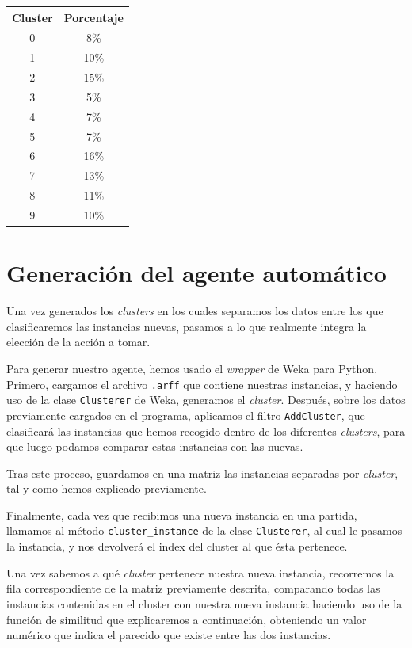 \documentclass[12pt]{article}
\begin{document}
\begin{center}
    \begin{tabular}{c | c}
        \hline
        Cluster & Porcentaje \\
        \hline
        0   &    8\% \\
        1   &   10\% \\
        2   &   15\% \\
        3   &    5\% \\
        4   &    7\% \\
        5   &    7\% \\
        6   &   16\% \\
        7   &   13\% \\
        8   &   11\% \\
        9   &   10\% \\
    \end{tabular}
\end{center}

\section{Generación del agente automático}

Una vez generados los \textit{clusters} en los cuales separamos los datos entre los que clasificaremos las instancias nuevas, pasamos a lo que realmente integra la elección de la acción a tomar.

Para generar nuestro agente, hemos usado el \textit{wrapper} de Weka para Python. Primero, cargamos el archivo \texttt{.arff} que contiene nuestras instancias, y haciendo uso de la clase \texttt{Clusterer} de Weka, generamos el \textit{cluster}.
Después, sobre los datos previamente cargados en el programa, aplicamos el filtro \texttt{AddCluster}, que clasificará las instancias que hemos recogido dentro de los diferentes \textit{clusters}, para que luego podamos comparar estas instancias con las nuevas.

Tras este proceso, guardamos en una matriz las instancias separadas por \textit{cluster}, tal y como hemos explicado previamente.

Finalmente, cada vez que recibimos una nueva instancia en una partida, llamamos al método \texttt{cluster\_instance} de la clase \texttt{Clusterer}, al cual le pasamos la instancia, y nos devolverá el index del cluster al que ésta pertenece.

Una vez sabemos a qué \textit{cluster} pertenece nuestra nueva instancia, recorremos la fila correspondiente de la matriz previamente descrita, comparando todas las instancias contenidas en el cluster con nuestra nueva instancia haciendo uso de la función de similitud que explicaremos a continuación, obteniendo un valor numérico que indica el parecido que existe entre las dos instancias.
\end{document}
